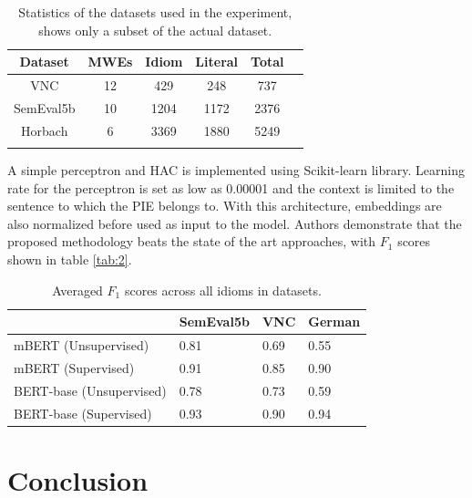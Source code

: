 \documentclass[11pt,a4paper]{article}
\begin{document}
\begin{table}[H]
  \caption{Statistics of the datasets used in the experiment, shows only a subset of the actual dataset.}
  \begin{tabular}{c c c c c c} 
    Dataset & MWEs & Idiom & Literal & Total\\[0.1ex] 
    \hline\hline
    VNC &  12 & 429 & 248 & 737 \\ 
    SemEval5b &  10 & 1204 & 1172 & 2376 \\
    Horbach &  6 & 3369 & 1880 & 5249 \\ 
    \label{tab:1}
  \end{tabular}
\end{table}

A simple perceptron and HAC is implemented using Scikit-learn library. Learning rate for the perceptron is set as low as 0.00001 and the context is limited to the sentence to which the PIE belongs to. With this architecture, embeddings are also normalized before used as input to the model. Authors demonstrate that the proposed methodology beats the state of the art approaches, with $F_1$ scores shown in table \ref{tab:2}.

\begin{table}[h]
  \begin{tabular}{l l l l}  
   &        SemEval5b             &      VNC          &   German     \\ \hline \hline
  mBERT (Unsupervised)      &      0.81       &      0.69            &   0.55        \\ 
  mBERT (Supervised)     &       0.91         &    0.85          &    0.90       \\ \hline
  BERT-base (Unsupervised)       &  0.78             &      0.73         &  0.59         \\ 
  BERT-base (Supervised)         &     0.93        &      0.90           &      0.94     \\ 
  \end{tabular}
  \caption{Averaged $F_1$ scores across all idioms in datasets.}
\end{table}


\section{Conclusion}
\end{document}
